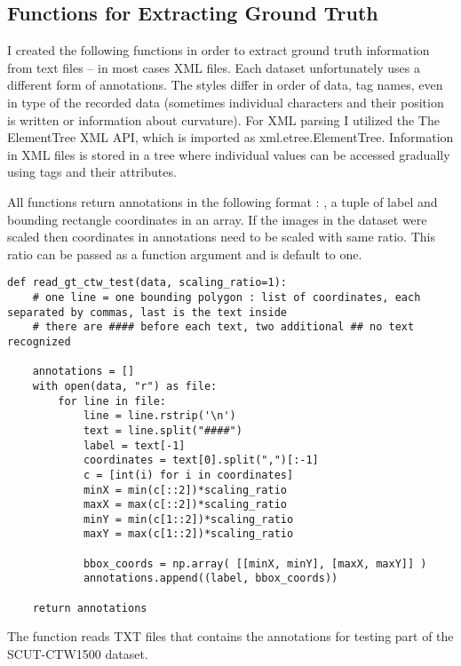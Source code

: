 \subsection*{Functions for Extracting Ground Truth}

I created the following functions in order to extract ground truth information from  text files -- in most cases XML files. Each dataset unfortunately uses a different form of annotations. The styles differ in order of data, tag names, even in type of the recorded data (sometimes individual characters and their position is written or information about curvature). For XML parsing I utilized the The ElementTree XML API, which is imported as xml.etree.ElementTree. Information in XML files is stored in a tree where individual values can be accessed gradually using tags and their attributes.

All functions return annotations in the following format :
\newline {}, a tuple of label and bounding rectangle coordinates in an array. 
If the images in the dataset were scaled then coordinates in annotations need to be scaled with same ratio. This ratio can be passed as a function argument and is default to one.

\begin{lstlisting}[caption=read\_gt\_ctw\_test]
def read_gt_ctw_test(data, scaling_ratio=1):
    # one line = one bounding polygon : list of coordinates, each separated by commas, last is the text inside 
    # there are #### before each text, two additional ## no text recognized

    annotations = []
    with open(data, "r") as file:
        for line in file:
            line = line.rstrip('\n')
            text = line.split("####")
            label = text[-1]
            coordinates = text[0].split(",")[:-1]
            c = [int(i) for i in coordinates]
            minX = min(c[::2])*scaling_ratio
            maxX = max(c[::2])*scaling_ratio
            minY = min(c[1::2])*scaling_ratio
            maxY = max(c[1::2])*scaling_ratio

            bbox_coords = np.array( [[minX, minY], [maxX, maxY]] )
            annotations.append((label, bbox_coords))

    return annotations
\end{lstlisting}

The function  reads TXT files that contains the annotations for testing part of the SCUT-CTW1500 dataset.


